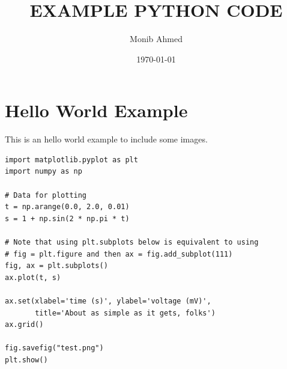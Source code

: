\documentclass[11pt]{article}
\author{Monib Ahmed}
\date{\today}
\title{EXAMPLE PYTHON CODE}
\begin{document}
\maketitle
\tableofcontents


\section{Hello World Example}
\label{sec:orgcd5ddb5}
This is an hello world example to include some images.

\begin{verbatim}
import matplotlib.pyplot as plt
import numpy as np

# Data for plotting
t = np.arange(0.0, 2.0, 0.01)
s = 1 + np.sin(2 * np.pi * t)

# Note that using plt.subplots below is equivalent to using
# fig = plt.figure and then ax = fig.add_subplot(111)
fig, ax = plt.subplots()
ax.plot(t, s)

ax.set(xlabel='time (s)', ylabel='voltage (mV)',
       title='About as simple as it gets, folks')
ax.grid()

fig.savefig("test.png")
plt.show()
\end{verbatim}
\end{document}
